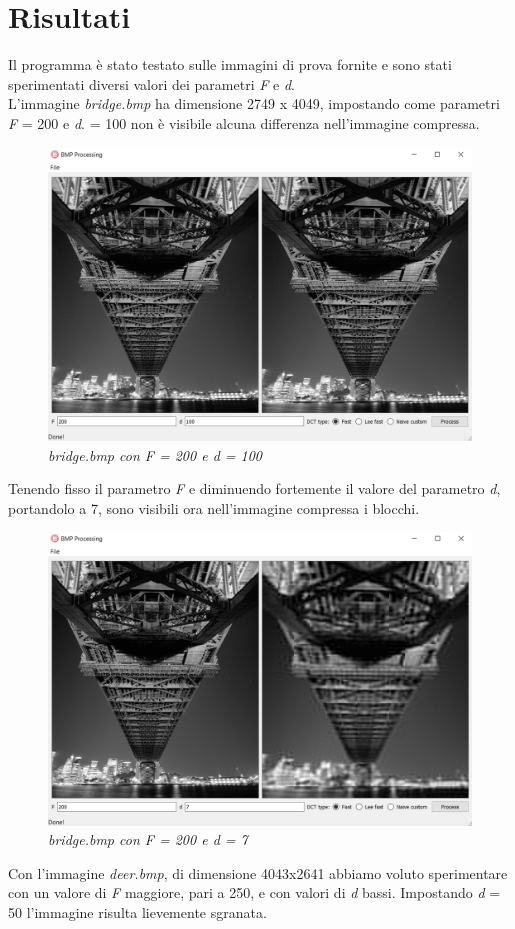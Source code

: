 \documentclass[a4paper,12pt]{report}
\begin{document}
\section{Risultati}
Il programma è stato testato sulle immagini di prova fornite e sono stati sperimentati diversi valori dei parametri \textit{F} e \textit{d}. \\

\noindent L'immagine \textit{bridge.bmp} ha dimensione 2749 x 4049, impostando come parametri  \textit{F} = 200 e \textit{d}. = 100 non è visibile alcuna differenza nell'immagine compressa.

\begin{figure}[H]
\centering
\includegraphics[width=0.6\linewidth]{../img/bridge_200_100.png}
\caption{\textit{bridge.bmp con F = 200 e d = 100}}
\end{figure}

\noindent Tenendo fisso il parametro \textit{F} e diminuendo fortemente il valore del parametro \textit{d}, portandolo a 7, sono visibili ora nell'immagine compressa i blocchi.

\begin{figure}[H]
\centering
\includegraphics[width=0.6\linewidth]{../img/bridge_200_7.png}
\caption{\textit{bridge.bmp con F = 200 e d = 7}}
\end{figure}

\newpage
\noindent Con l'immagine \textit{deer.bmp}, di dimensione 4043x2641 abbiamo voluto sperimentare con un valore di \textit{F} maggiore, pari a 250, e con valori di \textit{d} bassi.
Impostando \textit{d} = 50 l'immagine risulta lievemente sgranata.
\end{document}
